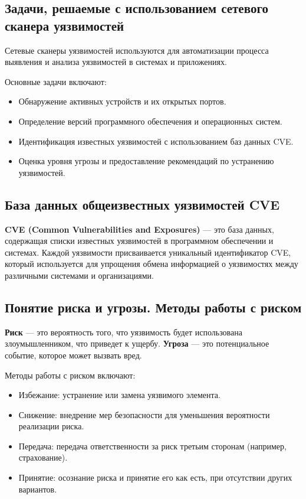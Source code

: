 \subsection*{Задачи, решаемые с использованием сетевого сканера уязвимостей}

Сетевые сканеры уязвимостей используются для автоматизации процесса выявления
и анализа уязвимостей в системах и приложениях.

Основные задачи включают:

\begin{itemize}
	\item Обнаружение активных устройств и их открытых портов.
	\item Определение версий программного обеспечения
		и операционных систем.
	\item Идентификация известных уязвимостей
		с использованием баз данных CVE.
	\item Оценка уровня угрозы
		и предоставление рекомендаций по устранению уязвимостей.
\end{itemize}

\subsection*{База данных общеизвестных уязвимостей CVE}

\textbf{CVE (Common Vulnerabilities and Exposures)} --- это база данных,
содержащая списки известных уязвимостей в программном обеспечении и системах.
Каждой уязвимости присваивается уникальный идентификатор CVE,
который используется
для упрощения обмена информацией о уязвимостях между различными системами и организациями.

\subsection*{Понятие риска и угрозы. Методы работы с риском}

\textbf{Риск} --- это вероятность того,
что уязвимость будет использована злоумышленником, что приведет к ущербу.
\textbf{Угроза} --- это потенциальное событие, которое может вызвать вред.

Методы работы с риском включают:

\begin{itemize}
	\item Избежание: устранение или замена уязвимого элемента.
	\item Снижение:
		внедрение мер безопасности для уменьшения вероятности реализации риска.
	\item Передача:
		передача ответственности за риск третьим сторонам (например, страхование).
	\item Принятие:
		осознание риска и принятие его как есть, при отсутствии других вариантов.
\end{itemize}

